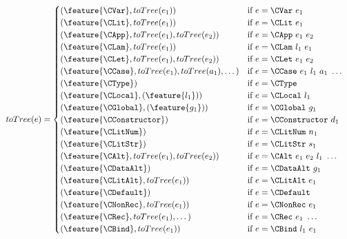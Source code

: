 \begin{align*}\label{fig:totree}
  toTree(e) &=
  \begin{cases}
    (\feature{\CVar},     toTree(e_1))                                 & \text{if $e = \CVar\ e_1$} \\
    (\feature{\CLit},     toTree(e_1))                                 & \text{if $e = \CLit\ e_1$} \\
    (\feature{\CApp},     toTree(e_1), toTree(e_2))                    & \text{if $e = \CApp\ e_1\ e_2$} \\
    (\feature{\CLam},     toTree(e_1))                                 & \text{if $e = \CLam\ l_1\ e_1$} \\
    (\feature{\CLet},     toTree(e_1), toTree(e_2))                    & \text{if $e = \CLet\ e_1\ e_2$} \\
    (\feature{\CCase},    toTree(e_1), toTree(a_1), \dots)             & \text{if $e = \CCase\ e_1\ l_1\ a_1\ \dots$} \\
    (\feature{\CType})                                                & \text{if $e = \CType$} \\
    (\feature{\CLocal},   (\feature{l_1}))                            & \text{if $e = \CLocal\ l_1$} \\
    (\feature{\CGlobal},  (\feature{g_1}))                            & \text{if $e = \CGlobal\ g_1$} \\
    (\feature{\CConstructor})                                         & \text{if $e = \CConstructor\ d_1$} \\
    (\feature{\CLitNum})                                              & \text{if $e = \CLitNum\ n_1$} \\
    (\feature{\CLitStr})                                              & \text{if $e = \CLitStr\ s_1$} \\
    (\feature{\CAlt},     toTree(e_1), toTree(e_2))                   & \text{if $e = \CAlt\ e_1\ e_2\ l_1\ \dots$}  \\
    (\feature{\CDataAlt})                                             & \text{if $e = \CDataAlt\ g_1$}  \\
    (\feature{\CLitAlt},  toTree(e_1))                                & \text{if $e = \CLitAlt\ e_1$}  \\
    (\feature{\CDefault})                                             & \text{if $e = \CDefault$}  \\
    (\feature{\CNonRec},  toTree(e_1))                                & \text{if $e = \CNonRec\ e_1$}  \\
    (\feature{\CRec},     toTree(e_1), \dots)                         & \text{if $e = \CRec\ e_1\ \dots$} \\
    (\feature{\CBind},    toTree(e_1))                                & \text{if $e = \CBind\ l_1\ e_1$}
  \end{cases}
\end{align*}

